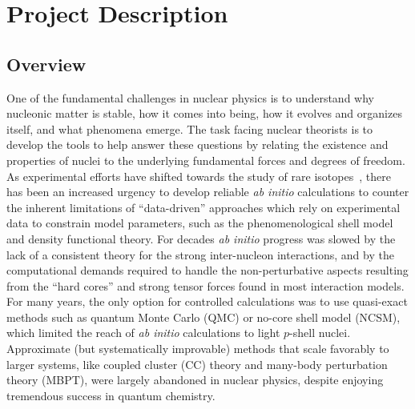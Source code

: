 \newpage




\section{Project Description}


\subsection{Overview}
\label{Overview}
One of the fundamental challenges in nuclear physics is to understand
why nucleonic matter is stable, how it comes into being, how it
evolves and organizes itself, and what phenomena emerge. The task
facing nuclear theorists is to develop the tools to help answer these
questions by relating the existence and properties of nuclei to the
underlying fundamental forces and degrees of freedom. As experimental
efforts have shifted towards the study of rare
isotopes~\cite{Geesaman:2015fha,NSACdecadal,Balantekin:2014opa}, there
has been an increased urgency to develop reliable \emph{ab initio}
calculations to counter the inherent limitations of ``data-driven''
approaches which rely on experimental data to constrain model
parameters, such as the phenomenological shell model and density
functional theory. For decades \emph{ab initio} progress was slowed by
the lack of a consistent theory for the strong inter-nucleon
interactions, and by the computational demands required to handle the
non-perturbative aspects resulting from the ``hard cores'' and strong
tensor forces found in most interaction models.  For many years, the
only option for controlled calculations was to use quasi-exact methods
such as quantum Monte Carlo (QMC) or no-core shell model (NCSM), which
limited the reach of \emph{ab initio} calculations to light $p$-shell
nuclei. Approximate (but systematically improvable) methods that scale
favorably to larger systems, like coupled cluster (CC) theory and
many-body perturbation theory (MBPT), were largely abandoned in
nuclear physics, despite enjoying tremendous success in quantum
chemistry.


